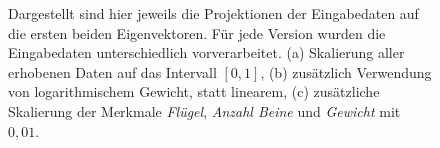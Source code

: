  \begin{figure}
  \qquad
  \qquad
  
  \caption{Dargestellt sind hier jeweils die Projektionen der Eingabedaten auf die ersten beiden Eigenvektoren. Für jede Version wurden die Eingabedaten unterschiedlich vorverarbeitet. (a) Skalierung aller erhobenen Daten auf das Intervall $[0, 1]$, (b) zusätzlich Verwendung von logarithmischem Gewicht, statt linearem, (c) zusätzliche Skalierung der Merkmale \emph{Flügel}, \emph{Anzahl Beine} und \emph{Gewicht} mit $0{,}01$.}
  \label{projections_scales}
 \end{figure}
 
